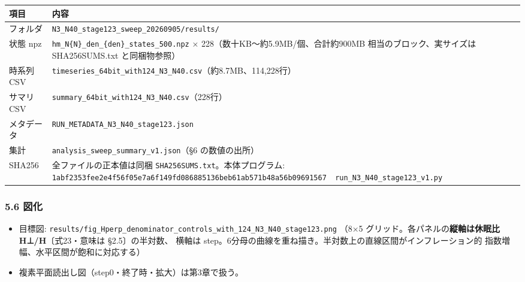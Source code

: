 \documentclass[
  a4paper,
]{ltjsarticle}
\newcounter{none} %
\providecommand{\tightlist}{%
  \setlength{\itemsep}{0pt}\setlength{\parskip}{0pt}}
\begin{document}
{\def\LTcaptype{none} %
\begin{longtable}[]{@{}
  >{\raggedright\arraybackslash}p{}
  >{\raggedright\arraybackslash}p{}@{}}
\toprule\noalign{}
\begin{minipage}[b]{\linewidth}\raggedright
項目
\end{minipage} & \begin{minipage}[b]{\linewidth}\raggedright
内容
\end{minipage} \\
\midrule\noalign{}
\endhead
\bottomrule\noalign{}
\endlastfoot
フォルダ & \texttt{N3\_N40\_stage123\_sweep\_20260905/results/} \\
状態 npz & \texttt{hm\_N\{N\}\_den\_\{den\}\_states\_500.npz} ×
228（数十KB〜約5.9MB/個、合計約900MB 相当のブロック、実サイズは
SHA256SUMS.txt と同梱物参照） \\
時系列 CSV &
\texttt{timeseries\_64bit\_with124\_N3\_N40.csv}（約8.7MB、114,228行） \\
サマリ CSV & \texttt{summary\_64bit\_with124\_N3\_N40.csv}（228行） \\
メタデータ & \texttt{RUN\_METADATA\_N3\_N40\_stage123.json} \\
集計 & \texttt{analysis\_sweep\_summary\_v1.json}（§6 の数値の出所） \\
SHA256 & 全ファイルの正本値は同梱
\texttt{SHA256SUMS.txt}。本体プログラム:
\texttt{1abf2353fee2e4f56f05e7a6f149fd086885136beb61ab571b48a56b09691567\ \ run\_N3\_N40\_stage123\_v1.py} \\
\end{longtable}
}

\subsubsection{5.6 図化}\label{ux56f3ux5316}

\begin{itemize}
\tightlist
\item
  目標図:
  \texttt{results/fig\_Hperp\_denominator\_controls\_with\_124\_N3\_N40\_stage123.png}
  （8×5 グリッド。各パネルの\textbf{縦軸は休眠比 H⊥/H}〔式23・意味は
  §2.5〕の半対数、 横軸は
  step。6分母の曲線を重ね描き。半対数上の直線区間がインフレーション的
  指数増幅、水平区間が飽和に対応する）
\item
  複素平面読出し図（step0・終了時・拡大）は第3章で扱う。
\end{itemize}
\end{document}
